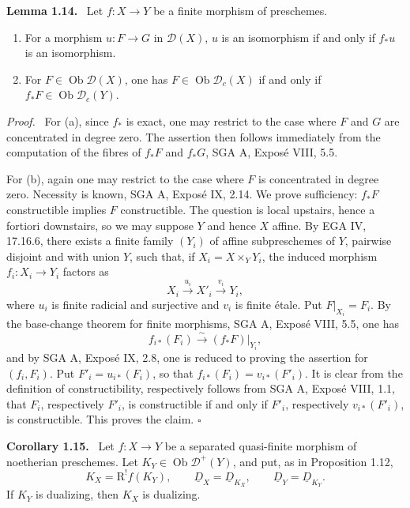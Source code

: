 \documentclass[11pt]{article}
\theoremstyle{plain}
\theoremstyle{definition}
\theoremstyle{remark}
\newenvironment{statement}[1]{\par\medskip\noindent\textbf{#1.}\ }{\par\medskip}
\newenvironment{prooftext}{\par\noindent\textit{Proof.}\ }{\par\medskip}
\newcommand{\D}{\mathcal D}\newcommand{\E}{\mathcal E}\newcommand{\F}{\mathcal F}
\DeclareMathOperator{\ob}{Ob}
\newcommand{\R}{\mathrm R}
\newcommand{\qedtext}{\hfill$\square$}
\begin{document}
\begin{statement}{Lemma 1.14}
Let $f:X\to Y$ be a finite morphism of preschemes.
\begin{enumerate}[label=\alph*)]
\item For a morphism $u:F\to G$ in $\D(X)$, $u$ is an isomorphism if and only if $f_*u$ is an isomorphism.
\item For $F\in\ob\D(X)$, one has $F\in\ob\D_c(X)$ if and only if $f_*F\in\ob\D_c(Y)$.
\end{enumerate}
\end{statement}

\begin{prooftext}
For (a), since $f_*$ is exact, one may restrict to the case where $F$ and $G$ are concentrated in degree zero. The assertion then follows immediately from the computation of the fibres of $f_*F$ and $f_*G$, SGA A, Exposé VIII, 5.5.

For (b), again one may restrict to the case where $F$ is concentrated in degree zero. Necessity is known, SGA A, Exposé IX, 2.14. We prove sufficiency: $f_*F$ constructible implies $F$ constructible. The question is local upstairs, hence a fortiori downstairs, so we may suppose $Y$ and hence $X$ affine. By EGA IV, 17.16.6, there exists a finite family $(Y_i)$ of affine subpreschemes of $Y$, pairwise disjoint and with union $Y$, such that, if $X_i=X\times_YY_i$, the induced morphism $f_i:X_i\to Y_i$ factors as
\[
   X_i\xrightarrow{u_i}X'_i\xrightarrow{v_i}Y_i,
\]
where $u_i$ is finite radicial and surjective and $v_i$ is finite étale. Put $F|_{X_i}=F_i$. By the base-change theorem for finite morphisms, SGA A, Exposé VIII, 5.5, one has
\[
   f_{i*}(F_i)\xrightarrow{\sim}(f_*F)|_{Y_i},
\]
and by SGA A, Exposé IX, 2.8, one is reduced to proving the assertion for $(f_i,F_i)$. Put $F'_i=u_{i*}(F_i)$, so that $f_{i*}(F_i)=v_{i*}(F'_i)$. It is clear from the definition of constructibility, respectively follows from SGA A, Exposé VIII, 1.1, that $F_i$, respectively $F'_i$, is constructible if and only if $F'_i$, respectively $v_{i*}(F'_i)$, is constructible. This proves the claim. \qedtext
\end{prooftext}

\begin{statement}{Corollary 1.15}
Let $f:X\to Y$ be a separated quasi-finite morphism of noetherian preschemes. Let $K_Y\in\ob\D^+(Y)$, and put, as in Proposition 1.12,
\[
   K_X=\R^!f(K_Y),\qquad \underline D_X=\underline D_{K_X},\qquad \underline D_Y=\underline D_{K_Y}.
\]
If $K_Y$ is dualizing, then $K_X$ is dualizing.
\end{statement}
\end{document}
